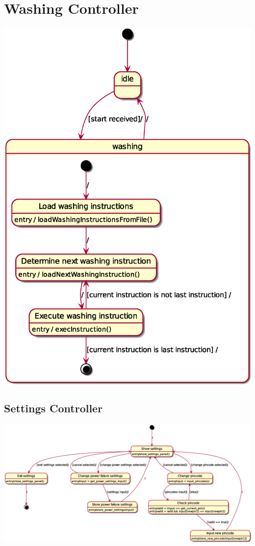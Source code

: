 		\section{Washing Controller}
		\includegraphics[scale=0.4]{washing_controller.eps}

		\begin{landscape}
			\thispagestyle{empty}
			\section{Settings Controller}
			\includegraphics[scale=0.5]{settings_controller.eps}
		\end{landscape}
